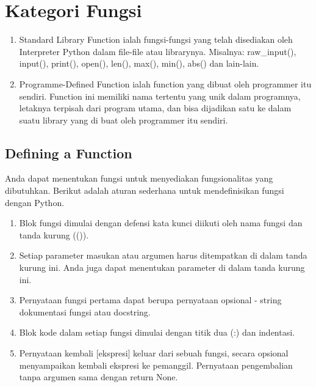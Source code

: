 \section{Kategori Fungsi}
\begin{enumerate}
\item Standard Library Function ialah fungsi-fungsi yang telah disediakan oleh Interpreter Python dalam file-file atau librarynya.  Misalnya: raw_input(), input(), print(), open(), len(), max(), min(), abs()  dan lain-lain. 
\item Programme-Defined Function ialah function yang dibuat oleh programmer itu sendiri. Function ini memiliki nama tertentu yang unik dalam programnya, letaknya terpisah dari program utama, dan bisa dijadikan satu ke dalam suatu library yang di buat oleh programmer itu sendiri.
\end{enumerate}

\subsection{Defining a Function} \par
Anda dapat menentukan fungsi untuk menyediakan fungsionalitas yang dibutuhkan. Berikut adalah aturan sederhana untuk mendefinisikan fungsi dengan Python. \par
\begin{enumerate}
\item Blok fungsi dimulai dengan defensi kata kunci diikuti oleh nama fungsi dan tanda kurung (()).
\item Setiap parameter masukan atau argumen harus ditempatkan di dalam tanda kurung ini. Anda juga dapat menentukan parameter di dalam tanda kurung ini.
\item Pernyataan fungsi pertama dapat berupa pernyataan opsional - string dokumentasi fungsi atau docstring.
\item Blok kode dalam setiap fungsi dimulai dengan titik dua (:) dan indentasi.
\item Pernyataan kembali [ekspresi] keluar dari sebuah fungsi, secara opsional menyampaikan kembali ekspresi ke pemanggil. Pernyataan pengembalian tanpa argumen sama dengan return None.
\end{enumerate}

